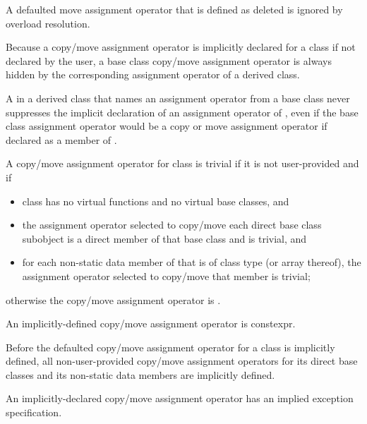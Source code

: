 \begin{note}
A defaulted move assignment operator that is defined as deleted is ignored by
overload resolution.
\end{note}

\pnum
{}%
%
Because a copy/move assignment operator is implicitly declared for a class
if not declared by the user,
a base class copy/move assignment operator is always hidden
by the corresponding assignment operator of a derived class.
\begin{note}
A  in a derived class 
that names an assignment operator from a base class
never suppresses the implicit declaration of
an assignment operator of ,
even if the base class assignment operator would be
a copy or move assignment operator
if declared as a member of .
\end{note}

\pnum
{}%
%
A copy/move assignment operator for class
is
trivial
if it is not user-provided and if
\begin{itemize}
\item
class
has no virtual functions
and no virtual base classes, and

\item the assignment operator selected to copy/move each direct
base class subobject is a direct member of that base class and is trivial, and

\item
for each non-static data member of
that is of class type (or array thereof),
the assignment operator selected to copy/move that member is trivial;
\end{itemize}
%
otherwise the copy/move assignment operator is
.

\pnum
An implicitly-defined copy/move assignment operator is constexpr.

\pnum
Before the defaulted copy/move assignment operator for a class is
implicitly defined,
all non-user-provided copy/move assignment operators for
its direct base classes and
its non-static data members are implicitly defined.
\begin{note}
An implicitly-declared copy/move assignment operator has an
implied exception specification.
\end{note}

